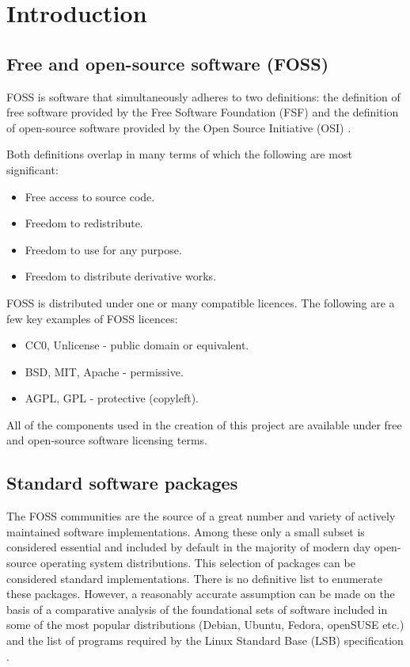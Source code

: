 \section{Introduction}\label{Introduction}

\subsection{Free and open-source software (FOSS)}

FOSS is software that simultaneously adheres to two definitions: the definition of free software provided by the Free Software Foundation (FSF) \cite{fsf} and the definition of open-source software provided by the Open Source Initiative (OSI) \cite{osi}.

Both definitions overlap in many terms of which the following are most significant:

\begin{itemize}
    \item Free access to source code.
    \item Freedom to redistribute.
    \item Freedom to use for any purpose.
    \item Freedom to distribute derivative works.
\end{itemize}

FOSS is distributed under one or many compatible licences. The following are a few key examples of FOSS licences:

\begin{itemize}
    \item CC0, Unlicense - public domain or equivalent.
    \item BSD, MIT, Apache - permissive.
    \item AGPL, GPL - protective (copyleft).
\end{itemize}

All of the components used in the creation of this project are available under free and open-source software licensing terms.

\subsection{Standard software packages}

The FOSS communities are the source of a great number and variety of actively maintained software implementations. Among these only a small subset is considered essential and included by default in the majority of modern day open-source operating system distributions. This selection of packages can be considered standard implementations. There is no definitive list to enumerate these packages. However, a reasonably accurate assumption can be made on the basis of a comparative analysis of the foundational sets of software included in some of the most popular distributions (Debian, Ubuntu, Fedora, openSUSE etc.) and the list of programs required by the Linux Standard Base (LSB) specification \cite{lsb}.

